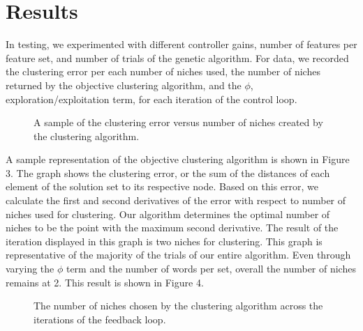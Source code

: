 \documentclass{sig-alternate}
\begin{document}
\section{Results}
In testing, we experimented with different controller gains, number of features per feature set, and number of trials of the genetic algorithm. For data, we recorded the clustering error per each number of niches used, the number of niches returned by the objective clustering algorithm, and the $\phi$, exploration/exploitation term, for each iteration of the control loop.
\begin{figure}[t]
\centering
{}
\caption{A sample of the clustering error versus number of niches created by the clustering algorithm.}
\label{fig:graph1}
\end{figure}
A sample representation of the objective clustering algorithm is shown in Figure 3. The graph shows the clustering error, or the sum of the distances of each element of the solution set to its respective node. Based on this error, we calculate the first and second derivatives of the error with respect to number of niches used for clustering. Our algorithm determines the optimal number of niches to be the point with the maximum second derivative. The result of the iteration displayed in this graph is two niches for clustering. This graph is representative of the majority of the trials of our entire algorithm. Even through varying the $\phi$ term and the number of words per set, overall the number of niches remains at 2. This result is shown in Figure 4.
\begin{figure}[t]
\centering
{}
\caption{The number of niches chosen by the clustering algorithm across the iterations of the feedback loop.}
\label{fig:graph2}
\end{figure}
\end{document}
